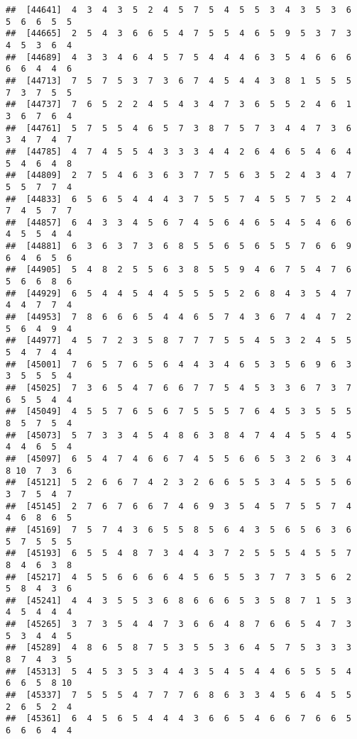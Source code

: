 \documentclass[
]{book}
\begin{document}
\begin{verbatim}
##  [44641]  4  3  4  3  5  2  4  5  7  5  4  5  5  3  4  3  5  3  6  5  6  6  5  5
##  [44665]  2  5  4  3  6  6  5  4  7  5  5  4  6  5  9  5  3  7  3  4  5  3  6  4
##  [44689]  4  3  3  4  6  4  5  7  5  4  4  4  6  3  5  4  6  6  6  6  6  4  4  6
##  [44713]  7  5  7  5  3  7  3  6  7  4  5  4  4  3  8  1  5  5  5  7  3  7  5  5
##  [44737]  7  6  5  2  2  4  5  4  3  4  7  3  6  5  5  2  4  6  1  3  6  7  6  4
##  [44761]  5  7  5  5  4  6  5  7  3  8  7  5  7  3  4  4  7  3  6  3  4  7  4  7
##  [44785]  4  7  4  5  5  4  3  3  3  4  4  2  6  4  6  5  4  6  4  5  4  6  4  8
##  [44809]  2  7  5  4  6  3  6  3  7  7  5  6  3  5  2  4  3  4  7  5  5  7  7  4
##  [44833]  6  5  6  5  4  4  4  3  7  5  5  7  4  5  5  7  5  2  4  7  4  5  7  7
##  [44857]  6  4  3  3  4  5  6  7  4  5  6  4  6  5  4  5  4  6  6  4  5  5  4  4
##  [44881]  6  3  6  3  7  3  6  8  5  5  6  5  6  5  5  7  6  6  9  6  4  6  5  6
##  [44905]  5  4  8  2  5  5  6  3  8  5  5  9  4  6  7  5  4  7  6  5  6  6  8  6
##  [44929]  6  5  4  4  5  4  4  5  5  5  5  2  6  8  4  3  5  4  7  4  4  7  7  4
##  [44953]  7  8  6  6  6  5  4  4  6  5  7  4  3  6  7  4  4  7  2  5  6  4  9  4
##  [44977]  4  5  7  2  3  5  8  7  7  7  5  5  4  5  3  2  4  5  5  5  4  7  4  4
##  [45001]  7  6  5  7  6  5  6  4  4  3  4  6  5  3  5  6  9  6  3  3  5  5  5  4
##  [45025]  7  3  6  5  4  7  6  6  7  7  5  4  5  3  3  6  7  3  7  6  5  5  4  4
##  [45049]  4  5  5  7  6  5  6  7  5  5  5  7  6  4  5  3  5  5  5  8  5  7  5  4
##  [45073]  5  7  3  3  4  5  4  8  6  3  8  4  7  4  4  5  5  4  5  4  4  6  5  4
##  [45097]  6  5  4  7  4  6  6  7  4  5  5  6  6  5  3  2  6  3  4  8 10  7  3  6
##  [45121]  5  2  6  6  7  4  2  3  2  6  6  5  5  3  4  5  5  5  6  3  7  5  4  7
##  [45145]  2  7  6  7  6  6  7  4  6  9  3  5  4  5  7  5  5  7  4  4  6  8  6  5
##  [45169]  7  5  7  4  3  6  5  5  8  5  6  4  3  5  6  5  6  3  6  5  7  5  5  5
##  [45193]  6  5  5  4  8  7  3  4  4  3  7  2  5  5  5  4  5  5  7  8  4  6  3  8
##  [45217]  4  5  5  6  6  6  6  4  5  6  5  5  3  7  7  3  5  6  2  5  8  4  3  6
##  [45241]  4  4  3  5  5  3  6  8  6  6  6  5  3  5  8  7  1  5  3  4  5  4  4  4
##  [45265]  3  7  3  5  4  4  7  3  6  6  4  8  7  6  6  5  4  7  3  5  3  4  4  5
##  [45289]  4  8  6  5  8  7  5  3  5  5  3  6  4  5  7  5  3  3  3  8  7  4  3  5
##  [45313]  5  4  5  3  5  3  4  4  3  5  4  5  4  4  6  5  5  5  4  6  6  5  8 10
##  [45337]  7  5  5  5  4  7  7  7  6  8  6  3  3  4  5  6  4  5  5  2  6  5  2  4
##  [45361]  6  4  5  6  5  4  4  4  3  6  6  5  4  6  6  7  6  6  5  6  6  6  4  4

\end{verbatim}
\end{document}
